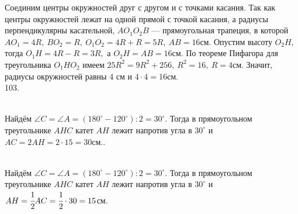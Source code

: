 \documentclass[12pt]{article}
\begin{document}
Соединим центры окружностей друг с другом и с точками касания. Так как центры окружностей лежат на одной прямой с точкой касания, а радиусы перпендикулярны касательной, $AO_1O_2B$ --- прямоугольная трапеция, в которой $AO_1=4R,\ BO_2=R,\ O_1O_2=4R+R=5R,\ AB=16$см. Опустим высоту $O_2H,$ тогда $O_1H=4R-R=3R,$ а $O_2H=AB=16$см. По теореме Пифагора для треугольника $O_1HO_2$ имеем $25R^2=9R^2+256,\ R^2=16,\ R=4$см. Значит, радиусы окружностей равны 4 см и $4\cdot4=16$см.\\
103. \begin{figure}[ht!]
\end{figure}\\
Найдём $\angle C=\angle A=(180^\circ-120^\circ):2=30^\circ.$ Тогда в прямоугольном треугольнике $AHC$ катет $AH$ лежит напротив угла в $30^\circ$ и $AC=2AH=2\cdot15=30$см.\newpage{}. \begin{figure}[ht!]
\end{figure}\\
Найдём $\angle C=\angle A=(180^\circ-120^\circ):2=30^\circ.$ Тогда в прямоугольном треугольнике $AHC$ катет $AH$ лежит напротив угла в $30^\circ$ и
$AH=\cfrac{1}{2}AC=\cfrac{1}{2}\cdot30=15$см.\\
\end{document}
